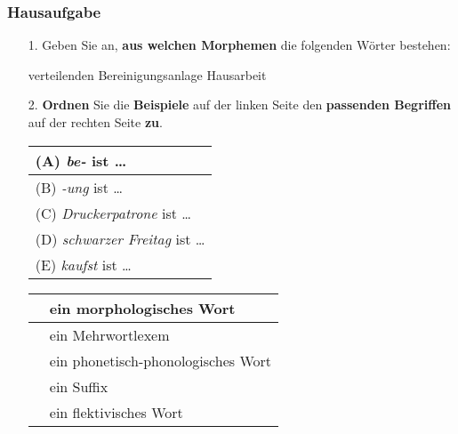 \begin{frame}
\frametitle{Hausaufgabe}

\begin{enumerate}
	\item[1.] Geben Sie an, \textbf{aus welchen Morphemen} die folgenden Wörter bestehen:	
	
	\begin{exe}
		\ex \label{ex:05aHA1}
		\begin{xlist}
			\ex verteilenden %
			\ex Bereinigungsanlage %
			\ex Hausarbeit %
		\end{xlist}
	\end{exe}	
	

	\item[2.] \textbf{Ordnen} Sie die \textbf{Beispiele} auf der linken Seite den \textbf{passenden Begriffen} auf der rechten Seite \textbf{zu}.

	\vspace{.5cm}

\begin{minipage}{0.4\textwidth}
	\centering
	\begin{tabular}{l}

		(A) \emph{be-} ist \ldots \\
		\hline
		(B) \emph{-ung} ist \ldots \\
		\hline
		(C) \emph{Druckerpatrone} ist \ldots \\
		\hline
		(D) \emph{schwarzer Freitag} ist \ldots \\
		\hline
		(E) \emph{kaufst} ist \ldots \\

	\end{tabular}
\end{minipage}
\hfill%
\begin{minipage}{0.56\textwidth}
	\centering
	\begin{tabular}{|p{}|l}

		 & ein morphologisches Wort \\
		\hline
		 & ein Mehrwortlexem \\
		\hline
		 & ein phonetisch-phonologisches Wort \\
		\hline
		 & ein Suffix\\
		\hline
		 & ein flektivisches Wort \\

	\end{tabular}
\end{minipage}

\end{enumerate}


\end{frame}


